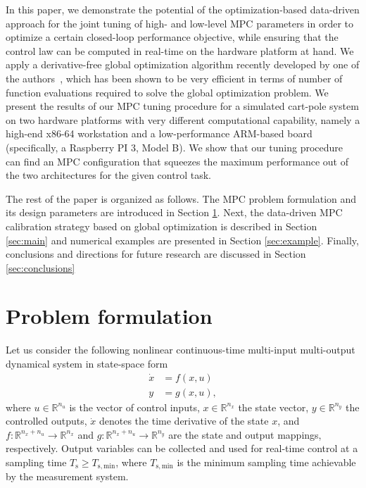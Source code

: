 \documentclass{article}
\newcommand{\Ts}{T_{\mathrm{s}}}
\newcommand{\Tsmin}{T_{\mathrm{s,min}}}
\newcommand{\nin}{n_u}
\newcommand{\nstate}{n_x}
\newcommand{\nout}{n_y}
\begin{document}
In this paper, we demonstrate the potential of the optimization-based data-driven approach for the joint tuning of high- and low-level MPC parameters in order to optimize a certain closed-loop performance objective, while ensuring that the control law can be  computed in real-time on the hardware platform at hand.   
We apply a  derivative-free global optimization algorithm recently developed by one of the authors~\citep{bemporad2019global}, which has been shown to be very efficient in terms of number of function evaluations  required to solve the global optimization problem.  
We  present the results of our MPC tuning procedure for a simulated cart-pole system on two hardware platforms with very different computational capability, namely a high-end x86-64 workstation and a low-performance ARM-based board (specifically, a Raspberry PI 3, Model B). We show that our tuning procedure can find an MPC configuration that squeezes the maximum performance out of the two architectures for the given control task.

The rest of the paper is organized as follows. The MPC problem formulation and its design parameters are introduced in Section \ref{sec:problem}. Next, the data-driven MPC calibration strategy based on global optimization is described in Section \ref{sec:main} and numerical examples are presented in Section \ref{sec:example}. Finally, conclusions and directions for future research are discussed in Section \ref{sec:conclusions}

\section{Problem formulation}\label{sec:problem}

Let us consider the following nonlinear continuous-time multi-input multi-output dynamical system 
in state-space form
\begin{subequations} \label{eqn:sys}
 \begin{align}
  \dot x &= f(x,u) \\
       y &= g(x,u),
 \end{align}%
 \label{mathcalS}%
\end{subequations}
where $u\in \mathbb{R}^{\nin}$ is the vector of control inputs, $x\in \mathbb{R}^{\nstate}$
the state vector, $y\in \mathbb{R}^{\nout}$ the controlled outputs, $\dot x$ denotes the time derivative of the state $x$, and $f: \mathbb{R}^{\nstate+\nin} \to\mathbb{R}^{\nstate}$ and $g: \mathbb{R}^{\nstate+\nin} \to\mathbb{R}^{\nout}$ are the state and output mappings, respectively. 
Output variables can be collected and used for real-time control at a sampling time $\Ts \geq \Tsmin$, where $\Tsmin$ is the minimum sampling time achievable by the measurement system.
\end{document}
